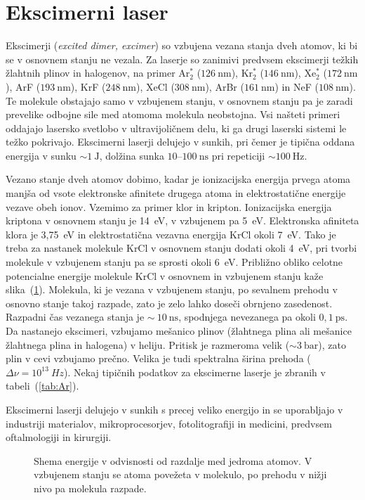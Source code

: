 \section{Ekscimerni laser}
Ekscimerji ({\it excited dimer, excimer}) so vzbujena vezana stanja dveh atomov, 
ki bi se v osnovnem stanju ne vezala. Za laserje so zanimivi predvsem ekscimerji
težkih žlahtnih plinov in halogenov, na primer Ar$_2^*$ ($126~\si{\nano\metre}$), 
Kr$_2^*$ ($146~\si{\nano\metre}$), Xe$_2^*$ ($172~\si{\nano\metre}$),
ArF ($193~\si{\nano\metre}$), KrF ($248~\si{\nano\metre}$), 
XeCl ($308~\si{\nano\metre}$), ArBr ($161~\si{\nano\metre}$) in 
NeF ($108~\si{\nano\metre}$). Te molekule obstajajo samo v vzbujenem stanju,
v osnovnem stanju pa je zaradi prevelike odbojne sile med atomoma molekula neobstojna.
Vsi našteti primeri oddajajo lasersko svetlobo v
ultravijoličnem delu, ki ga drugi laserski sistemi le težko pokrivajo. 
Ekscimerni laserji delujejo v sunkih, pri čemer je tipična oddana energija v sunku 
$\sim 1~\si{\joule}$, dolžina sunka $10$--$100~\si{\nano\second}$ pri repeticiji
$\sim 100~\si{\hertz}$.

Vezano stanje dveh atomov dobimo, kadar je ionizacijska energija prvega
atoma manjša od vsote elektronske afinitete drugega atoma in
elektrostatične energije vezave obeh ionov. Vzemimo za primer klor in
kripton. Ionizacijska energija kriptona v osnovnem stanju je 14~eV, v
vzbujenem pa 5~eV. Elektronska afiniteta klora je 3,75~eV in
elektrostatična vezavna energija KrCl okoli 7~eV. Tako je treba za nastanek
molekule KrCl v osnovnem stanju dodati okoli 4~eV, pri tvorbi
molekule v vzbujenem stanju pa se sprosti okoli 6~eV. Približno obliko
celotne potencialne energije molekule KrCl v osnovnem in vzbujenem stanju
kaže slika~(\ref{fig:exE}). Molekula, ki je vezana v vzbujenem stanju, po
sevalnem prehodu v osnovno stanje takoj razpade, zato je zelo lahko doseči
obrnjeno zasedenost. Razpadni čas vezanega stanja je $\sim~10~\si{\nano\second}$,
spodnjega nevezanega pa okoli $0,1~\si{\pico\second}$.
Da nastanejo ekscimeri, vzbujamo mešanico 
plinov (žlahtnega plina ali mešanice žlahtnega plina in halogena) v heliju. Pritisk
je razmeroma velik ($\sim 3~\si{\bar}$), zato plin v cevi vzbujamo prečno.
Velika je tudi spektralna širina prehoda ($\Delta\nu = 10^{13}~\si{Hz}$). Nekaj tipičnih podatkov 
za ekscimerne laserje je zbranih v tabeli~(\ref{tab:Ar}).

Ekscimerni laserji delujejo v sunkih s precej veliko energijo in se uporabljajo 
v industriji materialov, mikroprocesorjev, fotolitografiji in medicini, predvsem 
oftalmologiji in kirurgiji.
\begin{figure}[h]
\centering
\def\svgwidth{50truemm} 

\caption{Shema energije v odvisnosti od razdalje med jedroma atomov. V vzbujenem stanju
se atoma povežeta v molekulo, po prehodu v nižji nivo pa molekula razpade.}
\label{fig:exE}
\end{figure}

